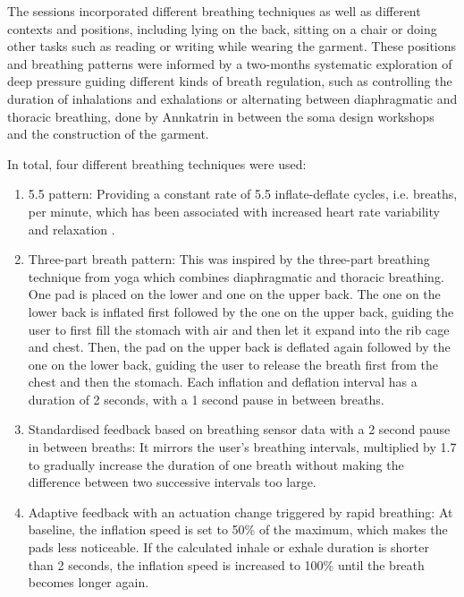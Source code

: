 
The sessions incorporated different breathing techniques as well as different contexts and positions, including lying on the back, sitting on a chair or doing other tasks such as reading or writing while wearing the garment. These positions and breathing patterns were informed by a two-months systematic exploration of deep pressure guiding different kinds of breath regulation, such as controlling the duration of inhalations and exhalations or alternating between diaphragmatic and thoracic breathing, done by Annkatrin in between the soma design workshops and the construction of the garment.

In total, four different breathing techniques were used:
\begin{enumerate}
    \item 5.5 pattern: Providing a constant rate of 5.5 inflate-deflate cycles, i.e. breaths, per minute, which has been associated with increased heart rate variability and relaxation \cite{lin_breathing_2014}.
    \item Three-part breath pattern: This was inspired by the three-part breathing technique from yoga \cite{sengupta_health_2012} which combines diaphragmatic and thoracic breathing. One pad is placed on the lower and one on the upper back. The one on the lower back is inflated first followed by the one on the upper back, guiding the user to first fill the stomach with air and then let it expand into the rib cage and chest. Then, the pad on the upper back is deflated again followed by the one on the lower back, guiding the user to release the breath first from the chest and then the stomach. Each inflation and deflation interval has a duration of 2 seconds, with a 1 second pause in between breaths.
    \item Standardised feedback based on breathing sensor data with a 2 second pause in between breaths: It mirrors the user’s breathing intervals, multiplied by 1.7 to gradually increase the duration of one breath without making the difference between two successive intervals too large.
    \item Adaptive feedback with an actuation change triggered by rapid breathing: At baseline, the inflation speed is set to 50\% of the maximum, which makes the pads less noticeable. If the calculated inhale or exhale duration is shorter than 2 seconds, the inflation speed is increased to 100\% until the breath becomes longer again.
\end{enumerate}

